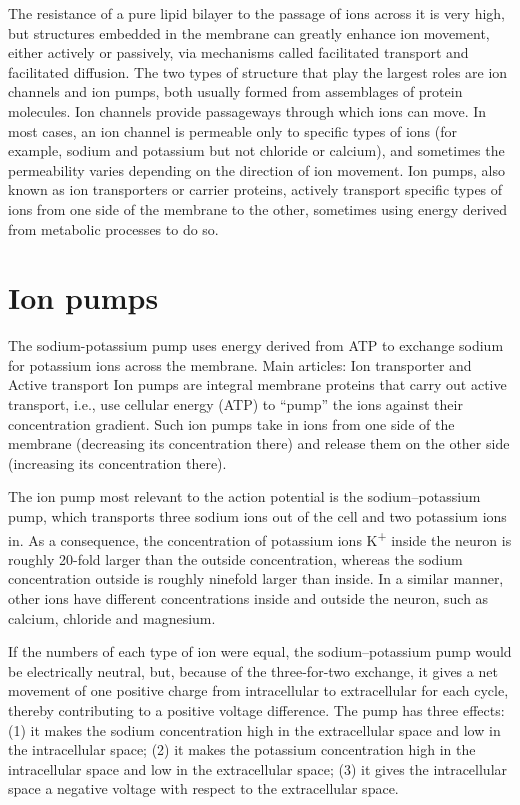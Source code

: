 The resistance of a pure lipid bilayer to the passage of ions across it is very high, but structures embedded in the membrane can greatly enhance ion movement, either actively or passively, via mechanisms called facilitated transport and facilitated diffusion. The two types of structure that play the largest roles are ion channels and ion pumps, both usually formed from assemblages of protein molecules. Ion channels provide passageways through which ions can move. In most cases, an ion channel is permeable only to specific types of ions (for example, sodium and potassium but not chloride or calcium), and sometimes the permeability varies depending on the direction of ion movement. Ion pumps, also known as ion transporters or carrier proteins, actively transport specific types of ions from one side of the membrane to the other, sometimes using energy derived from metabolic processes to do so.

\hypertarget{ion-pumps}{%
\section{Ion pumps}\label{ion-pumps}}

The sodium-potassium pump uses energy derived from ATP to exchange sodium for potassium ions across the membrane.
Main articles: Ion transporter and Active transport
Ion pumps are integral membrane proteins that carry out active transport, i.e., use cellular energy (ATP) to ``pump'' the ions against their concentration gradient. Such ion pumps take in ions from one side of the membrane (decreasing its concentration there) and release them on the other side (increasing its concentration there).

The ion pump most relevant to the action potential is the sodium--potassium pump, which transports three sodium ions out of the cell and two potassium ions in. As a consequence, the concentration of potassium ions K\textsuperscript{+} inside the neuron is roughly 20-fold larger than the outside concentration, whereas the sodium concentration outside is roughly ninefold larger than inside. In a similar manner, other ions have different concentrations inside and outside the neuron, such as calcium, chloride and magnesium.

If the numbers of each type of ion were equal, the sodium--potassium pump would be electrically neutral, but, because of the three-for-two exchange, it gives a net movement of one positive charge from intracellular to extracellular for each cycle, thereby contributing to a positive voltage difference. The pump has three effects: (1) it makes the sodium concentration high in the extracellular space and low in the intracellular space; (2) it makes the potassium concentration high in the intracellular space and low in the extracellular space; (3) it gives the intracellular space a negative voltage with respect to the extracellular space.

